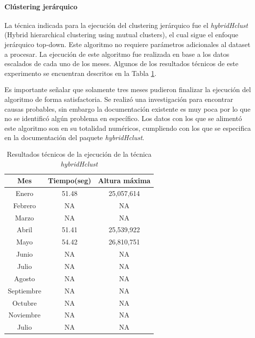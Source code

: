 \documentclass[12pt]{article}
\numberwithin{equation}{section}
\numberwithin{table}{section}
\numberwithin{figure}{section}
\begin{document}
\paragraph{Clústering jerárquico}
La técnica indicada para la ejecución del clustering jerárquico fue el \emph{hybridHclust} (Hybrid hierarchical clustering using mutual clusters), el cual sigue el enfoque jerárquico top-down. Este algoritmo no requiere parámetros adicionales al dataset a procesar.
La ejecución de este algoritmo fue realizada en base a los datos escalados de cada uno de los meses.
Algunos de los resultados técnicos de este experimento se encuentran descritos en la Tabla \ref{tbl:resultados-jerarquico}.

Es importante señalar que solamente tres meses pudieron finalizar la ejecución del algoritmo de forma satisfactoria.
Se realizó una investigación para encontrar causas probables, sin embargo la documentación existente es muy poca por lo que no se identificó algún problema en específico.
Los datos con los que se alimentó este algoritmo son en su totalidad numéricos, cumpliendo con los que se especifica en la documentación del paquete \emph{hybridHclust}.
\begin{table}[h]
\centering
\begin{tabular}{@{}ccc@{}}
\toprule
\textbf{Mes} & \textbf{Tiempo(seg)} & \textbf{Altura máxima} \\ \midrule
Enero        & 51.48             & 25,057,614                    \\
Febrero      & NA             & NA                    \\
Marzo        & NA             & NA                    \\
Abril        & 51.41             & 25,539,922                    \\
Mayo         & 54.42             & 26,810,751                    \\
Junio        & NA             & NA                    \\
Julio        & NA             & NA                    \\
Agosto       & NA             & NA                    \\
Septiembre   & NA             & NA                    \\
Octubre      & NA             & NA                    \\
Noviembre    & NA             & NA                    \\
Julio        & NA             & NA                    \\ \bottomrule
\end{tabular}
\caption{Resultados técnicos de la ejecución de la técnica \emph{hybridHclust}}
\label{tbl:resultados-jerarquico}
\end{table}
\end{document}
